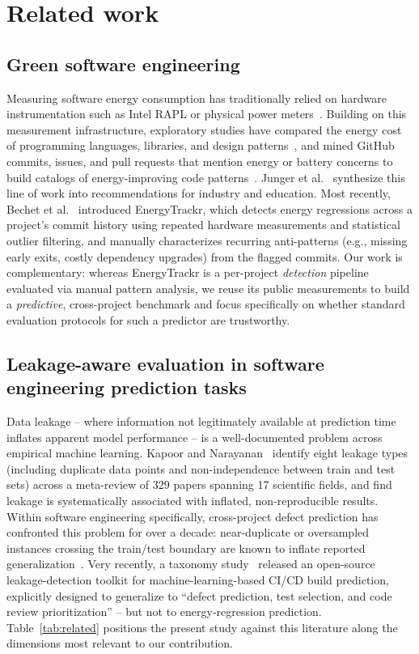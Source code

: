 \documentclass[preprint,12pt]{elsarticle}
\begin{document}
\section{Related work}
\label{sec:related}

\subsection{Green software engineering}
Measuring software energy consumption has traditionally relied on hardware instrumentation such as Intel RAPL or physical power meters~\citep{hindle2014greenminer}. Building on this measurement infrastructure, exploratory studies have compared the energy cost of programming languages, libraries, and design patterns~\citep{energyrace2025rpython}, and mined GitHub commits, issues, and pull requests that mention energy or battery concerns to build catalogs of energy-improving code patterns~\citep{cruz2019catalog}. Junger et al.~\cite{junger2024greencoding} synthesize this line of work into recommendations for industry and education. Most recently, Bechet et al.~\cite{bechet2026energytrackr} introduced EnergyTrackr, which detects energy regressions across a project's commit history using repeated hardware measurements and statistical outlier filtering, and manually characterizes recurring anti-patterns (e.g., missing early exits, costly dependency upgrades) from the flagged commits. Our work is complementary: whereas EnergyTrackr is a per-project \emph{detection} pipeline evaluated via manual pattern analysis, we reuse its public measurements to build a \emph{predictive}, cross-project benchmark and focus specifically on whether standard evaluation protocols for such a predictor are trustworthy.

\subsection{Leakage-aware evaluation in software engineering prediction tasks}
Data leakage -- where information not legitimately available at prediction time inflates apparent model performance -- is a well-documented problem across empirical machine learning. Kapoor and Narayanan~\cite{kapoor2023leakage} identify eight leakage types (including duplicate data points and non-independence between train and test sets) across a meta-review of 329 papers spanning 17 scientific fields, and find leakage is systematically associated with inflated, non-reproducible results. Within software engineering specifically, cross-project defect prediction has confronted this problem for over a decade: near-duplicate or oversampled instances crossing the train/test boundary are known to inflate reported generalization~\citep{cpdp2026domainadaptation}. Very recently, a taxonomy study~\cite{buildpred2026taxonomy} released an open-source leakage-detection toolkit for machine-learning-based CI/CD build prediction, explicitly designed to generalize to ``defect prediction, test selection, and code review prioritization'' -- but not to energy-regression prediction. Table~\ref{tab:related} positions the present study against this literature along the dimensions most relevant to our contribution.
\end{document}
